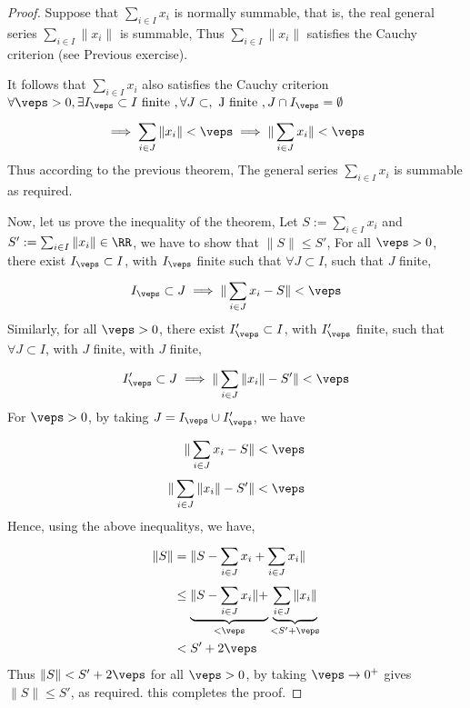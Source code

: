\begin{proof}
Suppose that $\sum_{i \in I}^{} x_{i} $  is normally summable,
that is, the real general series $\sum_{i \in  I}^{} 
\| x_{i} \| $  is summable, Thus $\sum_{ i \in  I}^{} 
\| x_{i} \| $ satisfies the Cauchy criterion (see Previous exercise).

It follows that $\sum_{i \in  I}^{} x_{i} $  also satisfies the Cauchy
criterion 
$
\forall  \veps  > 0, \exists  I_{\veps }\subset I \text{ finite } , 
\forall  J \subset , \text{ J finite }, J \cap I_{\veps } = \emptyset  
$
\[
\implies  
\sum_{i \in  J}^{}  \|  x_{i} \|  <  \veps  
\implies 
\| \sum_{i \in  J}^{} x_{i}  \|  <  \veps 
\]
Thus according to the previous theorem, 
The general series $\sum_{i \in  I}^{} x_{i} $  
is summable as required.


Now, let us prove the inequality of the theorem, 
Let $S := \sum_{i \in  I}^{} x_{i}  $  
and $S' := \sum_{i \in  I}^{} \| x_{i} \| \in  \RR  $, 
we have to show that $\| S \|  \leq  S' $,  
For all $\veps  > 0 $, there exist $I_{ \veps  } \subset I $, 
with $I_{\veps } $ finite such that $\forall  J \subset I $, such that 
$J $ finite, 
\[
I_{\veps } \subset J \implies 
\| \sum_{i \in  J}^{}  x_{i} - S\|  <  \veps 
\]
Similarly, for all $\veps > 0 $, there exist $I_{\veps }' \subset I $,
with $I_{\veps }' $  finite, such that $\forall  J \subset I $, with 
$J $ finite, with $J $ finite, 
\[
I_{\veps }' \subset J \implies 
\| \sum_{i \in  J}^{} \|  x_{i} \| - S' \|  <  \veps 
\]
For $\veps > 0 $, by taking 
$J = I_{\veps } \cup  I_{\veps }' $, we have 
\begin{align*}
	\| \sum_{i \in  J}^{} x_{i} - S \|  &<  \veps 
\\
	\| \sum_{i \in  J}^{} \| x_{i} \| - S' \|  &<   \veps 
\end{align*}
Hence, using the above inequalitys, we have, 
\begin{align*}
	\| S \|  &= 
\| S - \sum_{i \in  J}^{}  x_{i} + \sum_{i \in  J}^{} x_{i}  \|  
		 \\
		 & \leq 
		 \underbrace{
		 \| S - \sum_{i \in  J}^{} x_{i} \|  + 
		 }_{ <  \veps  } 
		 \underbrace{
		 \sum_{i \in  J}^{}  \| x_{i} \|  
		 }_{<  S' + \veps } \\ 
		 & <  S' + 2\veps 
\end{align*}
Thus $ \| S \|  <  S' + 2 \veps  $  for all $ \veps  > 0 $, by taking 
$ \veps  \rightarrow 0^{+} $  gives $ \|  S \|  \leq  S' $, as required.
this completes the proof.
\end{proof}

